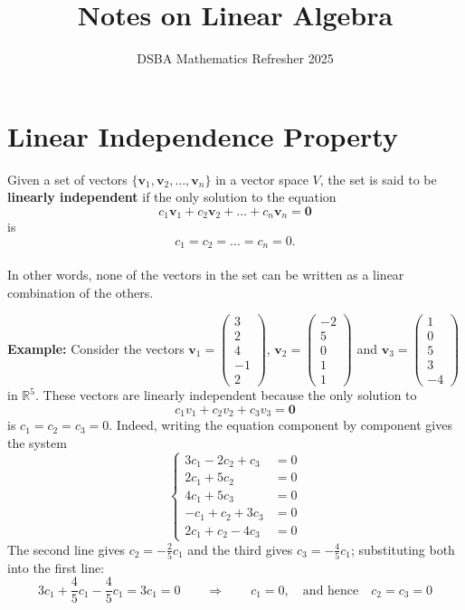 \documentclass[]{article}
\title{Notes on Linear Algebra}
\author{DSBA Mathematics Refresher 2025}
\date{}
\begin{document}
	
	\maketitle
	
	\begin{abstract}
		
	\end{abstract}
	
	
	\section{Linear Independence Property}
	
	Given a set of vectors $\{\mathbf{v}_1, \mathbf{v}_2, \dots, \mathbf{v}_n\}$ in a vector space $V$, the set is said to be \textbf{linearly independent} if the only solution to the equation
	$$
	c_1\mathbf{v}_1 + c_2\mathbf{v}_2 + \dots + c_n\mathbf{v}_n = \mathbf{0}
	$$
	is 
	$$
	c_1 = c_2 = \dots = c_n = 0.
	$$\\
	In other words, none of the vectors in the set can be written as a linear combination of the others.
	
	\noindent \textbf{Example:}
	Consider the vectors
	$\mathbf{v}_1 = \begin{pmatrix} 3 \\ 2 \\ 4 \\ -1 \\ 2 \end{pmatrix}$,
	$\mathbf{v}_2 = \begin{pmatrix} -2 \\ 5 \\ 0 \\ 1 \\ 1 \end{pmatrix}$
	and
	$\mathbf{v}_3 = \begin{pmatrix} 1 \\ 0 \\ 5 \\ 3 \\ -4 \end{pmatrix}$
	in $\mathbb{R}^5$.
	These vectors are linearly independent because the only solution to
	$$
	c_1v_1 + c_2v_2 + c_3v_3 = \mathbf{0}
	$$
	is $c_1 = c_2 = c_3 = 0$.
	Indeed, writing the equation component by component gives the system
	$$
	\begin{cases}
		3c_1 - 2c_2 + c_3 &= 0 \\
		2c_1 + 5c_2 &= 0 \\
		4c_1 + 5c_3 &= 0 \\
		-c_1 + c_2 + 3c_3 &= 0 \\
		2c_1 + c_2 - 4c_3 &= 0
	\end{cases}
	$$
	The second line gives $c_2 = -\frac{2}{5}c_1$ and the third gives $c_3 = -\frac{4}{5}c_1$;
	substituting both into the first line:
	$$
	3c_1 + \frac{4}{5}c_1 - \frac{4}{5}c_1 = 3c_1 = 0
	\qquad \Longrightarrow \qquad
	c_1 = 0, \quad \text{and hence} \quad c_2 = c_3 = 0
	$$
\end{document}
